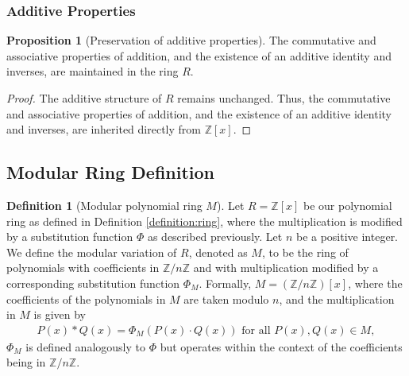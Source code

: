 \documentclass{article}
\theoremstyle{plain}
\theoremstyle{definition}
\newtheorem{definition}{Definition}
\newtheorem{proposition}{Proposition}
\begin{document}
\subsubsection{Additive Properties}
\begin{proposition}[Preservation of additive properties] \label{proposition:ring:3}
The commutative and associative properties of addition, and the existence of an additive identity and inverses, are maintained in the ring \(R\). 
\end{proposition}
\begin{proof}
The additive structure of \(R\) remains unchanged. Thus, the commutative and associative properties of addition, and the existence of an additive identity and inverses, are inherited directly from \( \mathbb{Z}[x] \).
\end{proof}

\subsection{Modular Ring Definition}
\begin{definition}[Modular polynomial ring $M$]  \label{definition:modularring}
Let \( R = \mathbb{Z}[x] \) be our polynomial ring as defined in Definition \ref{definition:ring}, where the multiplication is modified by a substitution function \(\Phi\) as described previously. Let \( n \) be a positive integer. We define the modular variation of \( R \), denoted as \( M \), to be the ring of polynomials with coefficients in \( \mathbb{Z}/n\mathbb{Z} \) and with multiplication modified by a corresponding substitution function \(\Phi_M\). Formally, \( M = (\mathbb{Z}/n\mathbb{Z})[x] \), where the coefficients of the polynomials in \( M \) are taken modulo \( n \), and the multiplication in \( M \) is given by
\begin{align}
    P(x) \ast Q(x) = \Phi_M(P(x) \cdot Q(x)) \text{ for all } P(x), Q(x) \in M,
\end{align}
\(\Phi_M\) is defined analogously to \(\Phi\) but operates within the context of the coefficients being in \( \mathbb{Z}/n\mathbb{Z} \).
\end{definition}
\end{document}
